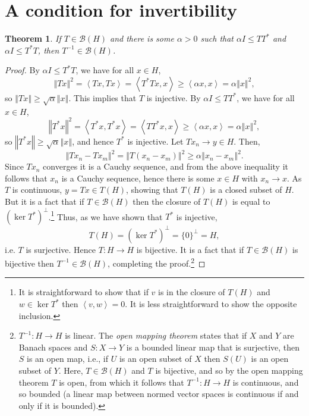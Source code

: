 \documentclass{article}
\newcommand{\inner}[2]{\left\langle #1, #2 \right\rangle}
\newcommand{\norm}[1]{\left\Vert #1 \right\Vert}
\newtheorem{theorem}{Theorem}
\begin{document}
\section{A condition for invertibility}
\begin{theorem}
If $T \in \mathscr{B}(H)$ and there is some $\alpha>0$ such that $\alpha I \leq TT^*$ and $\alpha I \leq T^*T$, then $T^{-1} \in \mathscr{B}(H)$.
\label{invertible}
\end{theorem}
\begin{proof}
By $\alpha I \leq T^*T$, we 
have for all $x \in H$,
\[
\norm{Tx}^2 = \inner{Tx}{Tx}=\inner{T^* Tx}{x} \geq \inner{\alpha x}{x} = \alpha \norm{x}^2,
\]
so $\norm{Tx} \geq \sqrt{\alpha}\norm{x}$. 
This implies that $T$ is injective.
By $\alpha I \leq TT^*$, we have for all $x \in H$,
\[
\norm{T^*x}^2 = \inner{T^*x}{T^*x}=\inner{TT^*x}{x} \geq \inner{\alpha x}{x} = \alpha\norm{x}^2,
\]
so $\norm{T^* x} \geq \sqrt{\alpha}\norm{x}$, and hence $T^*$ is injective.
Let $Tx_n \to y \in H$. Then,
\[
\norm{Tx_n-Tx_m}^2 =\norm{T(x_n-x_m)}^2 \geq \alpha \norm{x_n-x_m}^2.
\]
Since $Tx_n$ converges it is a Cauchy sequence, and from the above inequality it follows that $x_n$ is a Cauchy sequence, hence there is some
$x \in H$ with $x_n \to x$. As $T$ is continuous, $y=Tx \in T(H)$, showing that
$T(H)$ is a closed subset of $H$.
But it is a fact that if $T \in \mathscr{B}(H)$ then the closure of $T(H)$ is equal to $(\ker T^*)^\perp$.\footnote{It is straightforward
to show that if $v$ is in the closure of $T(H)$ and $w \in \ker T^*$ then $\inner{v}{w}=0$. It is less straightforward to show the opposite inclusion.}
Thus, as we have shown that $T^*$ is injective,
\[
T(H)=(\ker T^*)^\perp = \{0\}^\perp = H,
\]
i.e. $T$ is surjective. Hence $T:H \to H$ is bijective. It is a fact that if $T \in \mathscr{B}(H)$ is bijective then $T^{-1} \in \mathscr{B}(H)$, completing the proof.\footnote{$T^{-1}:H \to H$ is linear. The {\em open mapping theorem} states that if $X$ and $Y$ are Banach spaces and $S:X \to Y$ is a bounded linear map that is surjective, then $S$ is an open map, i.e., if $U$ is an open subset of $X$ then
$S(U)$ is an open subset of $Y$. Here, $T \in \mathscr{B}(H)$ and $T$ is bijective, and so by the open mapping theorem $T$ is open, from which it follows that $T^{-1}:H \to H$ is continuous,
and so bounded (a linear map between normed vector spaces is continuous if and only if it is bounded).} 
\end{proof}
\end{document}
